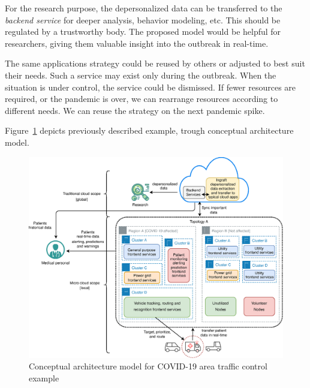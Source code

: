 {For the research purpose, the depersonalized data can be transferred to the \emph{backend service} for deeper analysis, behavior modeling, etc. This should be regulated by a trustworthy body. The proposed model would be helpful for researchers, giving them valuable insight into the outbreak in real-time. 

The same applications strategy could be reused by others or adjusted to best suit their needs. Such a service may exist only during the outbreak. When the situation is under control, the service could be dismissed. If fewer resources are required, or the pandemic is over, we can rearrange resources according to different needs. We can reuse the strategy on the next pandemic spike.

Figure~\ref{fig:fig25} depicts previously described example, trough conceptual architecture model.

\begin{figure}[H]
	\begin{center}
		\includegraphics[width=\columnwidth]{images/Figure25}
	\end{center}
	\vspace{-0.5cm}
	\caption{Conceptual architecture model for COVID-19 area traffic control example}
	\label{fig:fig25}
\end{figure}
}
%
%